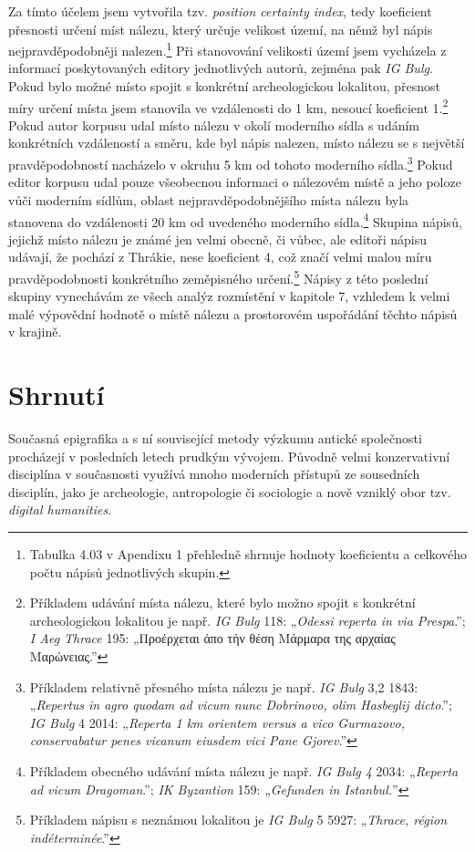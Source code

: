 Za tímto účelem jsem vytvořila tzv. {\em position certainty index}, tedy koeficient přesnosti určení míst nálezu, který určuje velikost území, na němž byl nápis nejpravděpodobněji nalezen.\footnote{Tabulka 4.03 v Apendixu 1 přehledně shrnuje hodnoty koeficientu a celkového počtu nápisů jednotlivých skupin.} Při stanovování velikosti území jsem vycházela z informací poskytovaných editory jednotlivých autorů, zejména pak {\em IG Bulg}. Pokud bylo možné místo spojit s konkrétní archeologickou lokalitou, přesnost míry určení místa jsem stanovila ve vzdálenosti do 1 km, nesoucí koeficient 1.\footnote{Příkladem udávání místa nálezu, které bylo možno spojit s konkrétní archeologickou lokalitou je např. {\em IG Bulg} 118: „{\em Odessi reperta in via Prespa}.”; {\em I Aeg Thrace} 195: „Προέρχεται άπο τήν θέση Μάρμαρα της αρχαίας Μαρώνειας.”} Pokud autor korpusu udal místo nálezu v okolí moderního sídla s udáním konkrétních vzdáleností a směru, kde byl nápis nalezen, místo nálezu se s největší pravděpodobností nacházelo v okruhu 5 km od tohoto moderního sídla.\footnote{Příkladem relativně přesného místa nálezu je např. {\em IG Bulg} 3,2 1843: „{\em Repertus in agro quodam ad vicum nunc Dobrinovo, olim Hasbeglij dicto}.”; {\em IG Bulg} 4 2014: „{\em Reperta 1 km orientem versus a vico Gurmazovo, conservabatur penes vicanum eiusdem vici Pane Gjorev}.”} Pokud editor korpusu udal pouze všeobecnou informaci o nálezovém místě a jeho poloze vůči moderním sídlům, oblast nejpravděpodobnějšího místa nálezu byla stanovena do vzdálenosti 20 km od uvedeného moderního sídla.\footnote{Příkladem obecného udávání místa nálezu je např. {\em IG Bulg 4} 2034: „{\em Reperta ad vicum Dragoman}.”; {\em IK Byzantion} 159: „{\em Gefunden in Istanbul.}”} Skupina nápisů, jejichž místo nálezu je známé jen velmi obecně, či vůbec, ale editoři nápisu udávají, že pochází z Thrákie, nese koeficient 4, což značí velmi malou míru pravděpodobnosti konkrétního zeměpisného určení.\footnote{Příkladem nápisu s neznámou lokalitou je {\em IG Bulg} 5 5927: „{\em Thrace, région indéterminée}.”} Nápisy z této poslední skupiny vynechávám ze všech analýz rozmístění v kapitole 7, vzhledem k velmi malé výpovědní hodnotě o místě nálezu a prostorovém uspořádání těchto nápisů v krajině.

\section[shrnutí-1]{Shrnutí}

Současná epigrafika a s ní související metody výzkumu antické společnosti procházejí v posledních letech prudkým vývojem. Původně velmi konzervativní disciplína v současnosti využívá mnoho moderních přístupů ze sousedních disciplín, jako je archeologie, antropologie či sociologie a nově vzniklý obor tzv. {\em digital humanities}.


